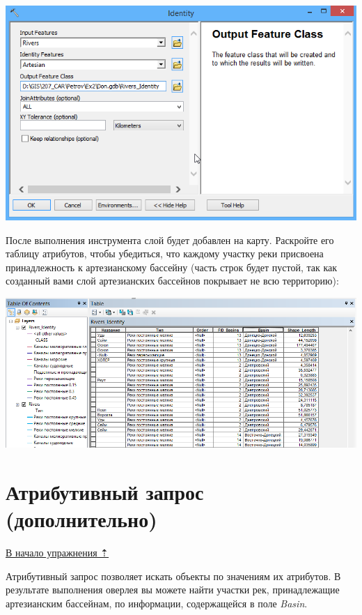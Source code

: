 \documentclass[12pt,]{book}
\begin{document}
\begin{enumerate}
  \includegraphics{images/Ex06/image20.png}
\end{enumerate}

После выполнения инструмента слой будет добавлен на карту. Раскройте его таблицу атрибутов, чтобы убедиться, что каждому участку реки присвоена принадлежность к артезианскому бассейну (часть строк будет пустой, так как созданный вами слой артезианских бассейнов покрывает не всю территорию):

\includegraphics{images/Ex06/image21.png}

\hypertarget{map-ref-hydrogeologic-attributes}{%
\section{Атрибутивный запрос (дополнительно)}\label{map-ref-hydrogeologic-attributes}}

\protect\hyperlink{map-ref-hydrogeologic}{В начало упражнения ⇡}

Атрибутивный запрос позволяет искать объекты по значениям их атрибутов. В результате выполнения оверлея вы можете найти участки рек, принадлежащие артезианским бассейнам, по информации, содержащейся в поле \emph{Basin}.
\end{document}
